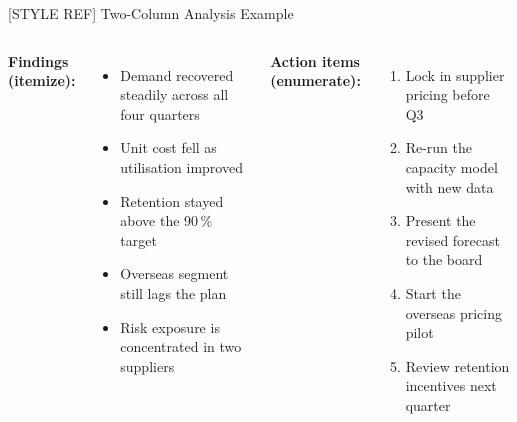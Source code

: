 \documentclass[aspectratio=169,10pt,xcolor=table]{beamer}
\begin{document}
\begin{frame}{[STYLE REF] Two-Column Analysis Example}
\small
\begin{columns}[T]
\textbf{Findings (itemize):}
\begin{itemize}
    \item Demand recovered steadily across all four quarters
    \item Unit cost fell as utilisation improved
    \item \textcolor{maincolor}{} Retention stayed above the 90\,\% target
    \item \textcolor{maincolor}{} Overseas segment still lags the plan
    \item Risk exposure is concentrated in two suppliers
\end{itemize}

\textbf{Action items (enumerate):}
\begin{enumerate}
    \item Lock in supplier pricing before Q3
    \item Re-run the capacity model with new data
    \item Present the revised forecast to the board
    \item Start the overseas pricing pilot
    \item Review retention incentives next quarter
\end{enumerate}
\end{columns}
\end{frame}
\end{document}
